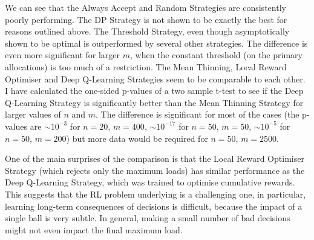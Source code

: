 We can see that the Always Accept and Random Strategies are consistently poorly performing. The DP Strategy is not shown to be exactly the best for reasons outlined above. The Threshold Strategy, even though asymptotically shown to be optimal is outperformed by several other strategies. The difference is even more significant for larger $m$, when the constant threshold (on the primary allocations) is too much of a restriction. The Mean Thinning, Local Reward Optimiser and Deep Q-Learning Strategies seem to be comparable to each other. I have calculated the one-sided p-values of a two sample t-test to see if the Deep Q-Learning Strategy is significantly better than the Mean Thinning Strategy for larger values of $n$ and $m$. The difference is significant for most of the cases (the p-values are $\sim 10^{-3}$ for $n=20$, $m=400$, $\sim 10^{-17}$ for $n=50$, $m=50$, $\sim 10^{-5}$ for $n=50$, $m=200$) but more data would be required for $n=50$, $m=2500$.  



One of the main surprises of the comparison is that the Local Reward Optimiser Strategy (which rejects only the maximum loads) has similar performance as the Deep Q-Learning Strategy, which was trained to optimise cumulative rewards. This suggests that the RL problem underlying \TwoThinning is a challenging one, in particular, learning long-term consequences of decisions is difficult, because the impact of a single ball is very subtle. In general, making a small number of bad decisions might not even impact the final maximum load. 






